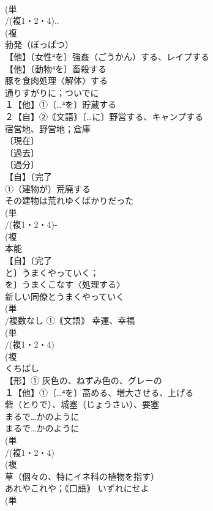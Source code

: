\documentclass[8pt]{extreport}
\begin{document}
\begin{CJK}{UTF8}{min}
\\	(単
\\	/(複1・2・4)..
\\	(複
\\	勃発（ぼっぱつ） 
\\	【他】〔女性⁴を〕強姦（ごうかん）する、レイプする 
\\	【他】〔動物⁴を〕畜殺する 
\\	豚を食肉処理〈解体〉する
\\	通りすがりに；ついでに
\\	１【他】①〔…⁴を〕貯蔵する 
\\	２【自】②｟文語｠〔…に〕野営する、キャンプする 
\\	宿営地、野営地；倉庫
\\	〔現在〕
\\	〔過去〕
\\	〔過分〕
\\	【自】〔完了
\\	①（建物が）荒廃する 
\\	その建物は荒れゆくばかりだった
\\	(単
\\	/(複1・2・4)-
\\	(複
\\	本能 
\\	【自】〔完了
\\	と〕うまくやっていく；
\\	を〕うまくこなす〈処理する〉 
\\	新しい同僚とうまくやっていく
\\	(単
\\	/複数なし ①｟文語｠ 幸運、幸福
\\	(単
\\	/(複1・2・4)
\\	(複
\\	くちばし 
\\	【形】① 灰色の、ねずみ色の、グレーの 
\\	１【他】①〔…⁴を〕高める、増大させる、上げる 
\\	砦（とりで）、城塞（じょうさい）、要塞 
\\	まるで…かのように 
\\	まるで…かのように 
\\	(単
\\	/(複1・2・4)
\\	(複
\\	草（個々の、特にイネ科の植物を指す）
\\	あれやこれや；｟口語｠ いずれにせよ
\\	(単

\end{CJK}
\end{document}
